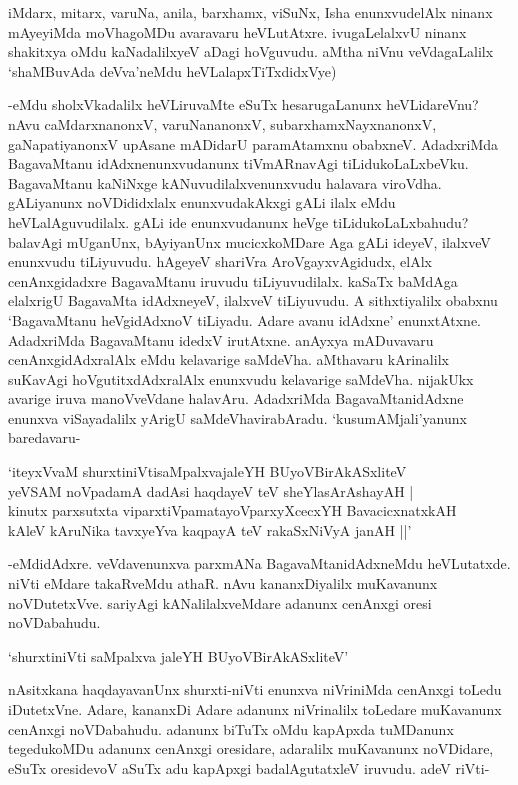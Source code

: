 iMdarx, mitarx, varuNa, anila, barxhamx, viSuNx, Isha enunxvudelAlx ninanx mAyeyiMda moVhagoMDu avaravaru heVLutAtxre. ivugaLelalxvU ninanx shakitxya oMdu kaNadalilxyeV aDagi hoVguvudu. aMtha niVnu veVdagaLalilx `shaMBuvAda deVva'neMdu heVLalapxTiTxdidxVye)

-eMdu sholxVkadalilx heVLiruvaMte eSuTx hesarugaLanunx heVLidareVnu? nAvu caMdarxnanonxV, varuNananonxV, subarxhamxNayxnanonxV, gaNapatiyanonxV upAsane mADidarU paramAtamxnu obabxneV. AdadxriMda BagavaMtanu idAdxnenunxvudanunx tiVmARnavAgi tiLidukoLaLxbeVku. BagavaMtanu kaNiNxge kANuvudilalxvenunxvudu halavara viroVdha. gALiyanunx noVDididxlalx enunxvudakAkxgi gALi ilalx eMdu heVLalAguvudilalx. gALi ide enunxvudanunx heVge tiLidukoLaLxbahudu? balavAgi mUganUnx, bAyiyanUnx mucicxkoMDare Aga gALi ideyeV, ilalxveV enunxvudu tiLiyuvudu. hAgeyeV shariVra AroVgayxvAgidudx, elAlx cenAnxgidadxre BagavaMtanu iruvudu tiLiyuvudilalx. kaSaTx baMdAga elalxrigU BagavaMta idAdxneyeV, ilalxveV tiLiyuvudu. A sithxtiyalilx obabxnu `BagavaMtanu heVgidAdxnoV tiLiyadu. Adare avanu idAdxne' enunxtAtxne. AdadxriMda BagavaMtanu idedxV irutAtxne. anAyxya mADuvavaru cenAnxgidAdxralAlx eMdu kelavarige saMdeVha. aMthavaru kArinalilx suKavAgi hoVgutitxdAdxralAlx enunxvudu kelavarige saMdeVha. nijakUkx avarige iruva manoVveVdane halavAru. AdadxriMda BagavaMtanidAdxne enunxva viSayadalilx yArigU saMdeVhavirabAradu. `kusumAMjali'yanunx baredavaru-

\begin{shloka}
`iteyxVvaM shurxtiniVtisaMpalxvajaleYH BUyoVBirAkASxliteV\\
yeVSAM noVpadamA dadAsi haqdayeV teV sheYlasArAshayAH |\\
kinutx parxsutxta viparxtiVpamatayoVparxyXcecxYH BavacicxnatxkAH\\
kAleV kAruNika tavxyeYva kaqpayA teV rakaSxNiVyA janAH ||'
\end{shloka}

-eMdidAdxre. veVdavenunxva parxmANa BagavaMtanidAdxneMdu heVLutatxde. niVti eMdare takaRveMdu athaR. nAvu kananxDiyalilx muKavanunx noVDutetxVve. sariyAgi kANalilalxveMdare adanunx cenAnxgi oresi noVDabahudu.

\begin{shloka}
`shurxtiniVti saMpalxva jaleYH BUyoVBirAkASxliteV'
\end{shloka}

nAsitxkana haqdayavanUnx shurxti-niVti enunxva niVriniMda cenAnxgi toLedu iDutetxVne. Adare, kananxDi Adare adanunx niVrinalilx toLedare muKavanunx cenAnxgi noVDabahudu. adanunx biTuTx oMdu kapApxda tuMDanunx tegedukoMDu adanunx cenAnxgi oresidare, adaralilx muKavanunx noVDidare, eSuTx oresidevoV aSuTx adu kapApxgi badalAgutatxleV iruvudu. adeV riVti-

